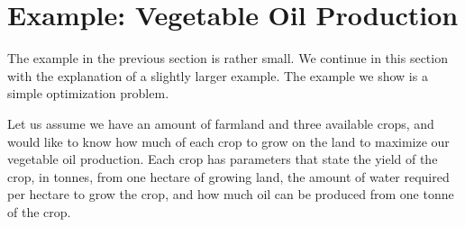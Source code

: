 \documentclass[a4paper]{article}
\begin{document}
\section{Example: Vegetable Oil Production}

The example in the previous section is rather small. We continue in this section
with the explanation of a slightly larger example. The example we show is a
simple optimization problem.

Let us assume we have an amount of farmland and three available crops, and would
like to know how much of each crop to grow on the land to maximize our vegetable
oil production. Each crop has parameters that state the yield of the crop, in
tonnes, from one hectare of growing land, the amount of water required per
hectare to grow the crop, and how much oil can be produced from one tonne of the
crop.
\end{document}
